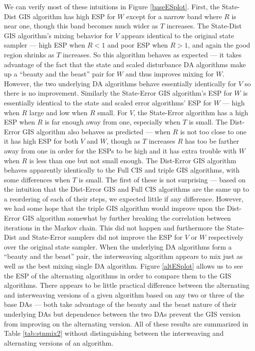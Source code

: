 \documentclass{article}
\begin{document}
We can verify most of these intuitions in Figure \ref{baseESplot}. First, the State-Dist GIS algorithm has high ESP for $W$ except for a narrow band where $R$ is near one, though this band becomes much wider as $T$ increases. The State-Dist GIS algorithm's mixing behavior for $V$ appears identical to the original state sampler --- high ESP when $R < 1$ and poor ESP when $R > 1$, and again the good region shrinks as $T$ increases. So this algorithm behaves as expected --- it takes advantage of the fact that the state and scaled disturbance DA algorithms make up a ``beauty and the beast'' pair for $W$ and thus improves mixing for $W$. However, the two underlying DA algorithms behave essentially identically for $V$ so there is no improvement. Similarly the State-Error GIS algorithm's ESP for $W$ is essentially identical to the state and scaled error algorithms' ESP for $W$ --- high when $R$ large and low when $R$ small.  For $V$, the State-Error algorithm has a high ESP when $R$ is far enough away from one, especially when $T$ is small. The Dist-Error GIS algorithm also behaves as predicted --- when $R$ is not too close to one it has high ESP for both $V$ and $W$, though as $T$ increases $R$ has too be farther away from one in order for the ESPs to be high and it has extra trouble with $W$ when $R$ is less than one but not small enough. The Dist-Error GIS algorithm behaves apparently identically to the Full CIS and triple GIS algorithms, with some differences when $T$ is small. The first of these is not surprising --- based on the intuition that the Dist-Error GIS and Full CIS algorithms are the same up to a reordering of each of their steps, we expected little if any difference. However, we had some hope that the triple GIS algorithm would improve upon the Dist-Error GIS algorithm somewhat by further breaking the correlation between iterations in the Markov chain. This did not happen and furthermore the State-Dist and State-Error samplers did not improve the ESP for $V$ or $W$ respectively over the original state sampler. When the underlying DA algorithms form a ``beauty and the beast'' pair, the interweaving algorithm appears to mix just as well as the best mixing single DA algorithm. Figure \ref{altESplot} allows us to see the ESP of the alternating algorithms in order to compare them to the GIS algorithms. There appears to be little practical difference between the alternating and interweaving versions of a given algorithm based on any two or three of the base DAs --- both take advantage of the beauty and the beast nature of their underlying DAs but dependence between the two DAs prevent the GIS version from improving on the alternating version. All of these results are summarized in Table \ref{tab:stnmix2} without distinguishing between the interweaving and alternating versions of an algorithm.
\end{document}
